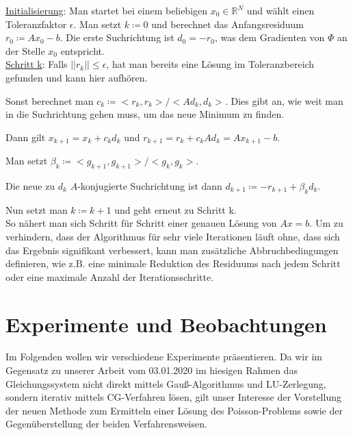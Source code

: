 \documentclass{scrartcl}
\begin{document}
\underline{Initialisierung}: Man startet bei einem beliebigen $x_0\in\mathbb{R}^N$ und wählt einen Toleranzfaktor $\epsilon$.
Man setzt $k\coloneqq 0$ und berechnet das Anfangsresiduum $r_0 \coloneqq Ax_0 - b$. Die erste Suchrichtung ist $d_0 = -r_0$, was dem Gradienten von $\Phi$ an der Stelle $x_0$ entspricht.\\

\underline{Schritt k}: Falls $||r_k||\leq \epsilon$, hat man bereits eine Lösung im Toleranzbereich gefunden und kann hier aufhören.

Sonst berechnet man $c_k \coloneqq <r_k, r_k>/<Ad_k,d_k>$. Dies gibt an, wie weit man in die Suchrichtung gehen muss, um das neue Minimum zu finden.

Dann gilt $x_{k+1} = x_k + c_k d_k$ und $r_{k+1} = r_k + c_k Ad_k = Ax_{k+1} - b$.

Man setzt $\beta_k \coloneqq <g_{k+1},g_{k+1}>/<g_{k},g_{k}>$.

Die neue zu $d_k$ $A$-konjugierte Suchrichtung ist dann $d_{k+1}\coloneqq -r_{k+1} + \beta_k d_k$.

Nun setzt man $k \coloneqq k+1$ und geht erneut zu Schritt k.\\

So nähert man sich Schritt für Schritt einer genauen Lösung von $Ax=b$.
Um zu verhindern, dass der Algorithmus für sehr viele Iterationen läuft ohne, dass sich das Ergebnis signifikant verbessert, kann man zusätzliche Abbruchbedingungen definieren, wie z.B. eine minimale Reduktion des Residuums nach jedem Schritt oder eine maximale Anzahl der Iterationsschritte.

\cite{tischendorf2019}

\pagebreak
\section{Experimente und Beobachtungen}
Im Folgenden wollen wir verschiedene Experimente präsentieren.
Da wir im Gegensatz zu unserer Arbeit vom 03.01.2020 im hiesigen Rahmen das Gleichungssystem nicht direkt mittels Gauß-Algorithmus und LU-Zerlegung, sondern iterativ mittels CG-Verfahren lösen, gilt unser Interesse der Vorstellung der neuen Methode zum Ermitteln einer Lösung des Poisson-Problems sowie der Gegenüberstellung der beiden Verfahrensweisen.
\end{document}
